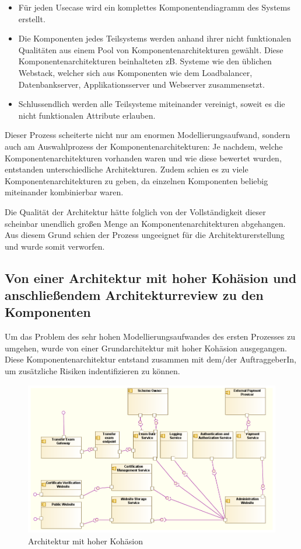 \begin{itemize}
  \item Für jeden Usecase wird ein komplettes Komponentendiagramm des Systems erstellt.
  \item Die Komponenten jedes Teilsystems werden anhand ihrer nicht funktionalen Qualitäten aus einem Pool von Komponentenarchitekturen gewählt. Diese Komponentenarchitekturen beinhalteten zB. Systeme wie den üblichen Webstack, welcher sich aus Komponenten wie dem Loadbalancer, Datenbankserver, Applikationsserver und Webserver zusammensetzt.
  \item Schlussendlich werden alle Teilsysteme miteinander vereinigt, soweit es die nicht funktionalen Attribute erlauben.
\end{itemize}

Dieser Prozess scheiterte nicht nur am enormen Modellierungsaufwand, sondern auch am Auswahlprozess der Komponentenarchitekturen: Je nachdem, welche Komponentenarchitekturen vorhanden waren und wie diese bewertet wurden, entstanden unterschiedliche Architekturen. Zudem schien es zu viele Komponentenarchitekturen zu geben, da einzelnen Komponenten beliebig miteinander kombinierbar waren.

Die Qualität der Architektur hätte folglich von der Vollständigkeit dieser scheinbar unendlich großen Menge an Komponentenarchitekturen abgehangen. Aus diesem Grund schien der Prozess ungeeignet für die Architekturerstellung und wurde somit verworfen.

\subsection{Von einer Architektur mit hoher Kohäsion und anschließendem Architekturreview zu den Komponenten}
Um das Problem des sehr hohen Modellierungsaufwandes des ersten Prozesses zu umgehen, wurde von einer Grundarchitektur mit hoher Kohäsion ausgegangen. Diese Komponentenarchitektur entstand zusammen mit dem/der AuftraggeberIn, um zusätzliche Risiken indentifizieren zu können.

\begin{figure}[!htbp]
    \centering
    \includegraphics[scale=0.5]{uml/vision2.png}
    \caption{Architektur mit hoher Kohäsion}
\end{figure}

